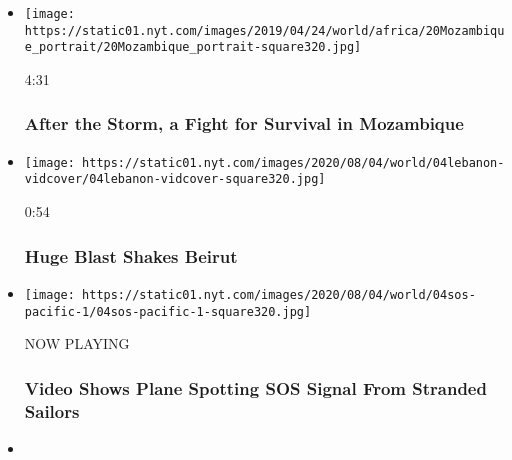 \begin{itemize}
\item
  \href{https://www.nytimes.com/video/world/africa/100000006439514/mozambique-flood-cyclone-idai.html?action=click\&module=video-series-bar\&region=header\&pgtype=Article\&playlistId=video/world}{}

  \texttt{[image: https://static01.nyt.com/images/2019/04/24/world/africa/20Mozambique\_portrait/20Mozambique\_portrait-square320.jpg]}

  4:31

  \hypertarget{after-the-storm-a-fight-for-survival-in-mozambique}{%
  \subsubsection{After the Storm, a Fight for Survival in
  Mozambique}\label{after-the-storm-a-fight-for-survival-in-mozambique}}
\item
  \href{https://www.nytimes.com/video/world/100000007272075/lebanon-beirut-blast.html?action=click\&module=video-series-bar\&region=header\&pgtype=Article\&playlistId=video/world}{}

  \texttt{[image: https://static01.nyt.com/images/2020/08/04/world/04lebanon-vidcover/04lebanon-vidcover-square320.jpg]}

  0:54

  \hypertarget{huge-blast-shakes-beirut}{%
  \subsubsection{Huge Blast Shakes
  Beirut}\label{huge-blast-shakes-beirut}}
\item
  \texttt{[image: https://static01.nyt.com/images/2020/08/04/world/04sos-pacific-1/04sos-pacific-1-square320.jpg]}

  NOW PLAYING

  \hypertarget{video-shows-plane-spotting-sos-signal-from-stranded-sailors-1}{%
  \subsubsection{Video Shows Plane Spotting SOS Signal From Stranded
  Sailors}\label{video-shows-plane-spotting-sos-signal-from-stranded-sailors-1}}
\item
  \href{https://www.nytimes.com/video/us/100000007249534/vivienne-westwood-canary-julian-assange.html?action=click\&module=video-series-bar\&region=header\&pgtype=Article\&playlistId=video/world}{}


\end{itemize}
